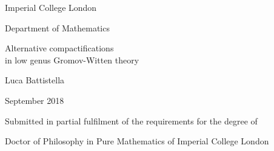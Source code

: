 

{\thispagestyle{empty}

\centering


{\Large
Imperial College London

Department of Mathematics

}

\vspace*{45mm}
{\huge \bfseries

Alternative compactifications \\ in low genus Gromov-Witten theory

} 

\vspace*{4cm}

{\Large 

Luca Battistella

\vspace*{2.5cm}
}

{\large
September 2018
}

\vspace*{4cm}

{\normalsize

Submitted in partial fulfilment of the requirements for the degree of

Doctor of Philosophy in Pure Mathematics
of Imperial College London
}

}
